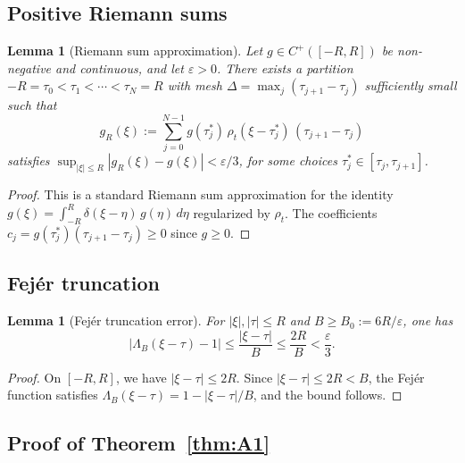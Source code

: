 \documentclass[11pt,a4paper]{article}
\newtheorem{lemma}[theorem]{Lemma}
\theoremstyle{definition}
\theoremstyle{remark}
\begin{document}
\subsection{Positive Riemann sums}

\begin{lemma}[Riemann sum approximation]\label{lem:riemann}
Let $g \in C^+([-R,R])$ be non-negative and continuous, and let $\varepsilon > 0$. There exists a partition $-R = \tau_0 < \tau_1 < \cdots < \tau_N = R$ with mesh $\Delta = \max_j(\tau_{j+1} - \tau_j)$ sufficiently small such that
\begin{equation}\label{eq:riemann}
  g_R(\xi) := \sum_{j=0}^{N-1} g(\tau_j^*)\, \rho_t(\xi - \tau_j^*)\, (\tau_{j+1} - \tau_j)
\end{equation}
satisfies $\sup_{|\xi| \leq R} |g_R(\xi) - g(\xi)| < \varepsilon/3$, for some choices $\tau_j^* \in [\tau_j, \tau_{j+1}]$.
\end{lemma}

\begin{proof}
This is a standard Riemann sum approximation for the identity $g(\xi) = \int_{-R}^R \delta(\xi - \eta)\, g(\eta)\, d\eta$ regularized by $\rho_t$. The coefficients $c_j = g(\tau_j^*)(\tau_{j+1} - \tau_j) \geq 0$ since $g \geq 0$.
\end{proof}

\subsection{Fej\'er truncation}

\begin{lemma}[Fej\'er truncation error]\label{lem:fejer}
For $|\xi|, |\tau| \leq R$ and $B \geq B_0 := 6R/\varepsilon$, one has
\begin{equation}\label{eq:fejer-err}
  |\Lambda_B(\xi - \tau) - 1| \leq \frac{|\xi - \tau|}{B} \leq \frac{2R}{B} < \frac{\varepsilon}{3}.
\end{equation}
\end{lemma}

\begin{proof}
On $[-R, R]$, we have $|\xi - \tau| \leq 2R$. Since $|\xi - \tau| \leq 2R < B$, the Fej\'er function satisfies $\Lambda_B(\xi - \tau) = 1 - |\xi - \tau|/B$, and the bound follows.
\end{proof}

\subsection{Proof of Theorem~\ref{thm:A1}}
\end{document}
